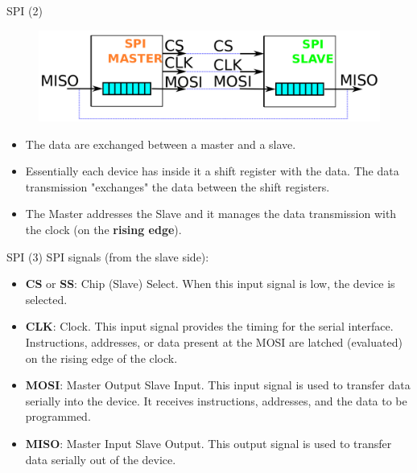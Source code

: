 \documentclass{beamer}
\begin{document}
    \begin{frame}{SPI (2)}
    	\begin{figure}[!tbh]
    		\centering
    		\includegraphics*[width=1\textwidth]{images/spi_schema}
    	\end{figure} 
    \begin{itemize}
    	\item The data are exchanged between a master and a slave.
    	\item Essentially each device has inside it a shift register with the data. The data transmission "exchanges" the data between the shift registers.
    	\item The  Master addresses the Slave and it manages the data transmission with the clock (on the \textbf{rising edge}).
    \end{itemize}  
    \end{frame}

    \begin{frame}{SPI (3)}
    	SPI signals (from the slave side):
    	\begin{itemize}
    		\item \textbf{CS} or \textbf{SS}: Chip (Slave) Select. When this input signal is low, the device is selected.
    		\item \textbf{CLK}: Clock. This input signal provides the timing for the serial interface. Instructions, addresses, or data present at the MOSI  are latched (evaluated) on the rising edge of the clock.
    		\item\textbf{MOSI}: Master Output Slave Input. This input signal is used to transfer data serially into the device. It receives instructions,
    		addresses, and the data to be programmed.
    		\item  \textbf{MISO}: Master Input Slave Output. This output signal is used to transfer data serially out of the device. %
    	\end{itemize}  
    \end{frame}
\end{document}

